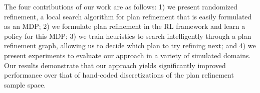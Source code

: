 The four contributions of our work are as follows: 1) we present randomized refinement, a local search
algorithm for plan refinement that is easily formulated as an MDP; 2) we formulate plan refinement in the
RL framework and learn a policy for this MDP; 3) we train heuristics to search intelligently
through a plan refinement graph, allowing us to decide which plan to try refining next;
and 4) we present experiments to evaluate our approach in a variety of simulated
domains. Our results demonstrate that our approach yields significantly improved
performance over that of hand-coded discretizations of the plan refinement sample space.
